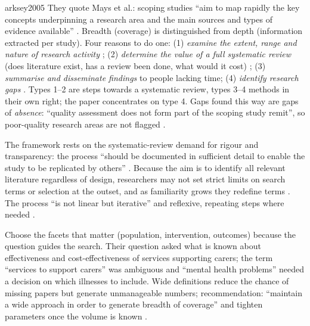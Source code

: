 \begin{papercard}{arksey2005}
 They quote Mays et al.: scoping studies ``aim to map rapidly the key concepts underpinning a research area and the main sources and types of evidence available'' . Breadth (coverage) is distinguished from depth (information extracted per study). Four reasons to do one: (1) \emph{examine the extent, range and nature of research activity} ; (2) \emph{determine the value of a full systematic review} (does literature exist, has a review been done, what would it cost) ; (3) \emph{summarise and disseminate findings} to people lacking time; (4) \emph{identify research gaps} . Types 1--2 are steps towards a systematic review, types 3--4 methods in their own right; the paper concentrates on type 4. Gaps found this way are gaps of \emph{absence}: ``quality assessment does not form part of the scoping study remit'', so poor-quality research areas are not flagged .

 The framework rests on the systematic-review demand for rigour and transparency: the process ``should be documented in sufficient detail to enable the study to be replicated by others'' . Because the aim is to identify all relevant literature regardless of design, researchers may not set strict limits on search terms or selection at the outset, and as familiarity grows they redefine terms . The process ``is not linear but iterative'' and reflexive, repeating steps where needed .

 Choose the facets that matter (population, intervention, outcomes) because the question guides the search. Their question asked what is known about effectiveness and cost-effectiveness of services supporting carers; the term ``services to support carers'' was ambiguous and ``mental health problems'' needed a decision on which illnesses to include. Wide definitions reduce the chance of missing papers but generate unmanageable numbers; recommendation: ``maintain a wide approach in order to generate breadth of coverage'' and tighten parameters once the volume is known .


\end{papercard}
